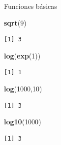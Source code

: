 \documentclass[
  ignorenonframetext,
]{beamer}
\newenvironment{Shaded}{\begin{snugshade}}{\end{snugshade}}
\newcommand{\DecValTok}[1]{\textcolor[rgb]{0.00,0.00,0.81}{#1}}
\newcommand{\FunctionTok}[1]{\textcolor[rgb]{0.13,0.29,0.53}{\textbf{#1}}}
\newcommand{\NormalTok}[1]{#1}
\begin{document}
\begin{frame}[fragile]{Funciones básicas}
\label{funciones-buxe1sicas-1}
\begin{Shaded}
\begin{Highlighting}[]
\FunctionTok{sqrt}\NormalTok{(}\DecValTok{9}\NormalTok{)}
\end{Highlighting}
\end{Shaded}

\begin{verbatim}
[1] 3
\end{verbatim}

\begin{Shaded}
\begin{Highlighting}[]
\FunctionTok{log}\NormalTok{(}\FunctionTok{exp}\NormalTok{(}\DecValTok{1}\NormalTok{))}
\end{Highlighting}
\end{Shaded}

\begin{verbatim}
[1] 1
\end{verbatim}

\begin{Shaded}
\begin{Highlighting}[]
\FunctionTok{log}\NormalTok{(}\DecValTok{1000}\NormalTok{,}\DecValTok{10}\NormalTok{)}
\end{Highlighting}
\end{Shaded}

\begin{verbatim}
[1] 3
\end{verbatim}

\begin{Shaded}
\begin{Highlighting}[]
\FunctionTok{log10}\NormalTok{(}\DecValTok{1000}\NormalTok{)}
\end{Highlighting}
\end{Shaded}

\begin{verbatim}
[1] 3
\end{verbatim}
\end{frame}
\end{document}
